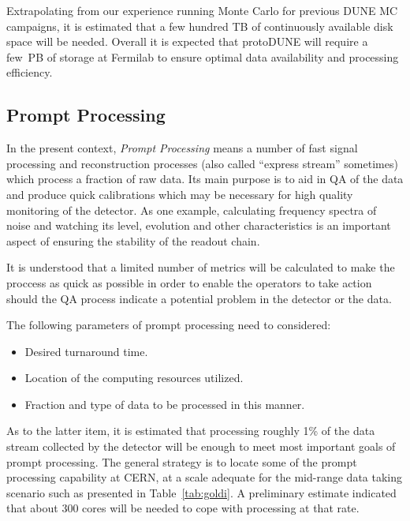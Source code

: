 Extrapolating from our experience running Monte Carlo for previous DUNE MC campaigns,
it is estimated that  a few hundred TB of continuously available disk space will be needed. Overall it is expected that protoDUNE will require
a few~PB of storage at Fermilab to ensure optimal data availability and  processing efficiency. 

\subsection{Prompt Processing}
\label{sec:prompt_processing}
In the present context, \textit{Prompt Processing} means a number of fast signal processing and reconstruction processes
(also called ``express stream'' sometimes) which process a fraction of raw data. Its main purpose is to aid in QA of the data
and produce quick calibrations which may be necessary for high quality monitoring of the detector. As one example,
calculating frequency spectra of noise and watching its level, evolution and other characteristics is an important aspect of ensuring
the stability of the readout chain.

It is understood
that a limited number of metrics will be calculated to make the proccess as quick as possible in order to enable
the operators to take action should the QA process indicate a potential problem in the detector or the data.

The following parameters of prompt processing need to considered:
\begin{itemize}
\item Desired turnaround time.
\item Location of the computing resources utilized.
\item Fraction and type of data to be processed in this manner.
\end{itemize}

\noindent As to the latter item, it is estimated that processing roughly 1\% of the data stream collected by the detector will
be enough to meet most important goals of prompt processing. 
The general strategy is to locate some of the prompt processing capability at CERN, at a scale adequate for the mid-range
data taking scenario such as presented in Table\, \ref{tab:goldi}. A preliminary estimate indicated that about 300 cores
will be needed to cope with processing at that rate.


